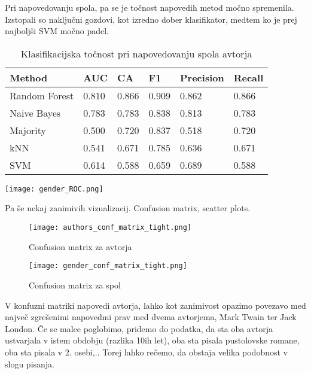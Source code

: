 \documentclass[a4paper,11pt]{article}
\begin{document}
Pri napovedovanju spola, pa se je točnost napovedih metod močno spremenila. Izstopali so naključni gozdovi, 
kot izredno dober klasifikator, medtem ko je prej najboljši SVM močno padel.

\begin{table}[ht]
  \begin{varwidth}[b]{0.7\linewidth}
    \centering
    \begin{tabular}{ l | l  l  l  l  l }
    \hline
    Method & AUC & CA & F1 & Precision & Recall \\ \hline \hline
    Random Forest & 0.810 & 0.866 & 0.909 & 0.862 & 0.866 \\ \hline
    Naive Bayes & 0.783 & 0.783 & 0.838 & 0.813 & 0.783 \\ \hline \hline
    Majority & 0.500 & 0.720 & 0.837 & 0.518 & 0.720 \\ \hline \hline
    kNN & 0.541 & 0.671 & 0.785 & 0.636 & 0.671 \\ \hline 
    SVM & 0.614 & 0.588 & 0.659 & 0.689 & 0.588 \\ \hline
    \end{tabular}
    \caption{Klasifikacijska točnost pri napovedovanju spola avtorja}
    \label{table:tocnost}
  \end{varwidth}%
  \hfill
  \begin{minipage}[b]{0.3\linewidth}
    \centering
    \texttt{[image: gender\_ROC.png]}
    \label{slika5}
  \end{minipage}
\end{table}

Pa še nekaj zanimivih vizualizacij. Confusion matrix, scatter plots.


\begin{figure}[H]
\begin{center}
\centering
  \texttt{[image: authors\_conf\_matrix\_tight.png]}
  \caption{Confusion matrix za avtorja}
  \label{slika6}
\end{center}
\end{figure}

\begin{figure}[H]
\begin{center}
\centering
  \texttt{[image: gender\_conf\_matrix\_tight.png]}
  \caption{Confusion matrix za spol}
  \label{slika7}
\end{center}
\end{figure}

V konfuzni matriki napovedi avtorja, lahko kot zanimivost opazimo povezavo med največ zgrešenimi napovedmi prav 
med dvema avtorjema, Mark Twain ter Jack London. Če se malce poglobimo, pridemo do podatka, da sta oba avtorja 
ustvarjala v istem obdobju (razlika 10ih let), oba sta pisala pustolovske romane, oba sta pisala v 2. osebi,.. Torej lahko rečemo,
 da obstaja velika podobnost v slogu pisanja.
\end{document}
